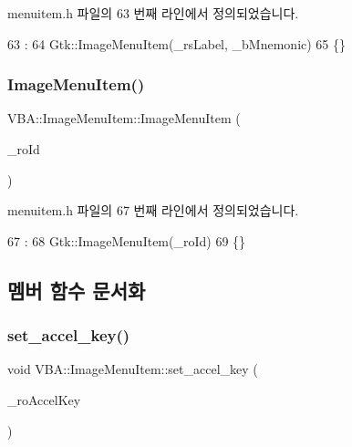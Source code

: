 menuitem.\+h 파일의 63 번째 라인에서 정의되었습니다.


\begin{DoxyCode}
63                                                                        :
64     Gtk::ImageMenuItem(\_rsLabel, \_bMnemonic)
65     \{\}
\end{DoxyCode}
\mbox{\label{class_v_b_a_1_1_image_menu_item_a3b7e700a518ea938513b80817662b1d1}} 
\subsubsection{\texorpdfstring{Image\+Menu\+Item()}{ImageMenuItem()}\hspace{0.1cm}{\footnotesize\ttfamily [4/4]}}
{\footnotesize\ttfamily V\+B\+A\+::\+Image\+Menu\+Item\+::\+Image\+Menu\+Item (\begin{DoxyParamCaption}\item[{\mbox{\hyperlink{getopt1_8c_a2c212835823e3c54a8ab6d95c652660e}{const}} Gtk\+::\+Stock\+ID \&}]{\+\_\+ro\+Id }\end{DoxyParamCaption})\hspace{0.3cm}{\ttfamily [inline]}}



menuitem.\+h 파일의 67 번째 라인에서 정의되었습니다.


\begin{DoxyCode}
67                                           :
68     Gtk::ImageMenuItem(\_roId)
69     \{\}
\end{DoxyCode}


\subsection{멤버 함수 문서화}
\mbox{\label{class_v_b_a_1_1_image_menu_item_a709d7e9ac328ac7d53f576caf804398b}} 
\subsubsection{\texorpdfstring{set\+\_\+accel\+\_\+key()}{set\_accel\_key()}}
{\footnotesize\ttfamily void V\+B\+A\+::\+Image\+Menu\+Item\+::set\+\_\+accel\+\_\+key (\begin{DoxyParamCaption}\item[{\mbox{\hyperlink{getopt1_8c_a2c212835823e3c54a8ab6d95c652660e}{const}} Gtk\+::\+Accel\+Key \&}]{\+\_\+ro\+Accel\+Key }\end{DoxyParamCaption})\hspace{0.3cm}{\ttfamily [inline]}}




